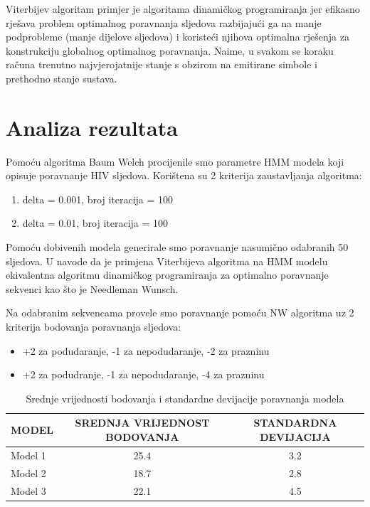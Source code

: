 \documentclass[times, utf8, seminar, numeric]{fer}
\begin{document}
 Viterbijev algoritam primjer je algoritama dinamičkog programiranja jer efikasno rješava problem optimalnog poravnanja sljedova razbijajući ga na manje podprobleme (manje dijelove sljedova) i koristeći njihova optimalna rješenja za konstrukciju globalnog optimalnog poravnanja. Naime, u svakom se koraku računa trenutno najvjerojatnije stanje s obzirom na emitirane simbole i prethodno stanje sustava.


\chapter{Analiza rezultata}
Pomoću algoritma Baum Welch procijenile smo parametre HMM modela koji opisuje poravnanje HIV sljedova. Korištena su 2 kriterija zaustavljanja algoritma: \begin{enumerate}
	\item delta = 0.001, broj iteracija = 100
	\item delta = 0.01, broj iteracija = 100
\end{enumerate}
Pomoću dobivenih modela generirale smo poravnanje nasumično odabranih 50 sljedova. U \cite{durbin1998biological} navode da je primjena Viterbijeva algoritma na HMM modelu ekivalentna algoritmu dinamičkog programiranja za optimalno poravnanje sekvenci kao što je Needleman Wunsch. 

Na odabranim sekvencama provele smo poravnanje pomoću NW algoritma uz 2 kriterija bodovanja poravnanja sljedova:
\begin{itemize}
	\item +2 za podudaranje, -1 za nepodudaranje, -2 za prazninu
	\item +2 za podudranje, -1 za nepodudaranje, -4 za prazninu
\end{itemize} 



\begin{table}[ht]
	\centering
	\begin{tabular}{lcc}
		\toprule
		\textbf{MODEL} & \textbf{SREDNJA VRIJEDNOST BODOVANJA} & \textbf{STANDARDNA DEVIJACIJA} \\
		\midrule
		Model 1 & 25.4 & 3.2 \\
		Model 2 & 18.7 & 2.8 \\
		Model 3 & 22.1 & 4.5 \\
		\bottomrule
	\end{tabular}
	\caption{Srednje vrijednosti bodovanja i standardne devijacije poravnanja modela}
	\label{tab:modeli}
\end{table}
\end{document}
